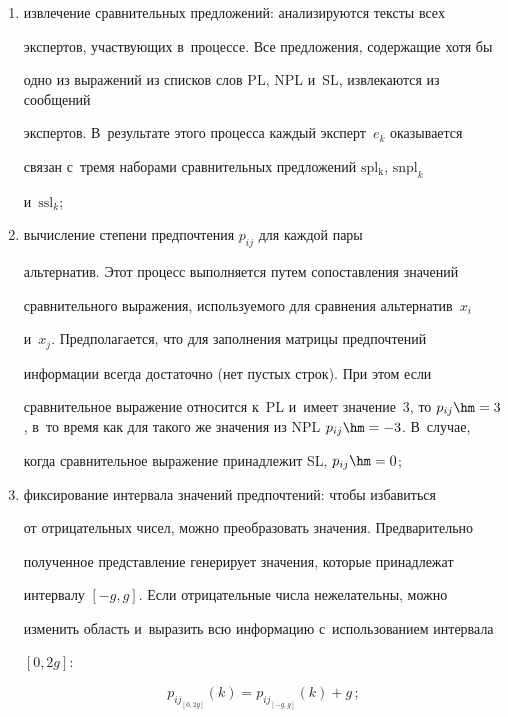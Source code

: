   \begin{enumerate}[(1)]


  \item извлечение сравнительных предложений: анализируются тексты всех 


экспертов, участвующих в~процессе. Все предложения, содержащие хотя бы 


одно из выражений из списков слов PL, NPL и~SL, извлекаются из сообщений 


экспертов. В~результате этого процесса каждый эксперт~$e_k$ оказывается 


связан с~тремя наборами сравнительных предложений $\mathrm{spl_k}$, $\mathrm{snpl}_k$ 


и~$\mathrm{ssl}_k$;


  \item вычисление степени предпочтения $p_{ij}$ для каждой пары 


альтернатив. Этот процесс выполняется путем сопоставления значений 


сравнительного выражения, используемого для сравнения альтернатив~$x_i$ 


и~$x_j$. Предполагается, что для заполнения матрицы предпочтений 


информации всегда достаточно (нет пустых строк). При этом если 


сравнительное выражение относится к~PL и~имеет значение~3, то $p_{ij}\hm= 


3$, в~то время как для такого же значения из NPL $p_{ij}\hm= -3$. В~случае, 


когда сравнительное выражение принадлежит SL, $p_{ij}\hm=0$; 


  \item  фиксирование интервала значений предпочтений: чтобы избавиться 


от отрицательных чисел, можно преобразовать значения. Предварительно 


полученное представление генерирует значения, которые принадлежат 


интервалу $[-g, g]$. Если отрицательные числа нежелательны, можно 


изменить область и~выразить всю информацию с~использованием интервала 


$[0, 2g]$:


  \begin{equation*}


  p_{ij_{[0,2g]}}(k)=p_{ij_{[-g,g]}}(k)+g\,;





\end{equation*}
\end{enumerate}
